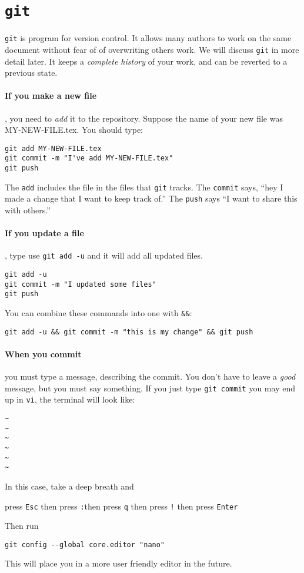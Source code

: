 \documentclass{ximera}
\begin{document}
\section{\texttt{git}}
\texttt{git} is program for version control. It allows many authors
to work on the same document without fear of
of overwriting others work. We will discuss \texttt{git} in more detail later.
It keeps a \textit{complete history} of your work, and can be reverted to a previous state. 




\paragraph{If you make a new file}, you need to \textit{add} it to the
repository. Suppose the name of your new file was MY-NEW-FILE.tex. You should
type:

\begin{verbatim}
git add MY-NEW-FILE.tex
git commit -m "I've add MY-NEW-FILE.tex"
git push
\end{verbatim}
The \verb!add! includes the file in the files that \verb!git! tracks. The
\verb!commit! says, ``hey I made a change that I want to keep track of.'' The
\verb!push! says ``I want to share this with others.''

\paragraph{If you update a file},
type use \verb!git add -u! and it will add all updated files.
\begin{verbatim}
git add -u
git commit -m "I updated some files"
git push
\end{verbatim}
You can combine these commands into one with \verb!&&!:
\begin{verbatim}
git add -u && git commit -m "this is my change" && git push
\end{verbatim}

\paragraph{When you commit} you must type a message, describing the commit. You don't have to leave a \textit{good} message, but you must say something.
If you just type \verb!git commit! you may end up in \verb!vi!, the terminal will look like:
\begin{verbatim}
~
~
~
~
~
~
\end{verbatim}
In this case, take a deep breath and 
\begin{center}
      press \verb!Esc! \quad then press \verb!:!\quad then press \verb!q! \quad
      then
      press \verb#!# \quad then press \verb!Enter!
\end{center}
Then run
\begin{verbatim}
git config --global core.editor "nano"
\end{verbatim}
This will place you in a more user friendly editor in the future. 
\end{document}
